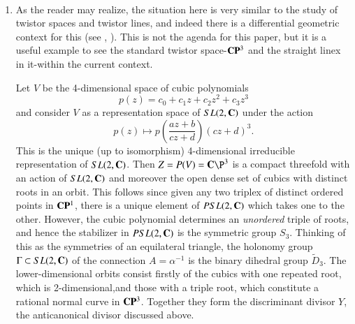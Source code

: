 \begin{example*}
~

\begin{enumerate}[]
\item As the reader may realize, the situation here is very similar to the study of twistor spaces and twistor lines, and indeed there is a differential geometric context for this (see \cite{art7-key6}, \cite{art7-key7}). This is not the agenda for this paper, but it is a useful example to see the standard twistor space-$\mathbf{C}\mathbf{P}^{3}$ and the straight linex in it-within the current context.

Let $V$ be the 4-dimensional space of cubic polynomials
$$
p(z)=c_{0} + c_{1}z +c_{2}z^{2} + c_{3}z^{3}
$$
and consider $V$ as a representation space of $SL(2, \mathbf{C})$ under the action
$$
p(z)\mapsto p \left( \dfrac{az + b}{cz + d}\right)(cz + d)^{3}.
$$
This is the unique (up to isomorphism) 4-dimensional irreducible representation of $SL(2, \mathbf{C})$. Then $Z= P(V) = \bC\P^{3}$ is a compact threefold with an action of $SL(2, \mathbf{C})$ and moreover the open dense set of cubics with distinct roots in an orbit. This follows since given any two triplex of distinct ordered points in $\mathbf{C}\mathbf{P}^{1}$, there is a unique element of $PSL(2, \mathbf{C})$ which takes one to the other. However, the cubic polynomial determines an \textit{unordered} triple of roots, and hence the stabilizer in $PSL(2, \mathbf{C})$ is the symmetric group $S_{3}$. Thinking of this as the symmetries of an equilateral triangle, the holonomy group $\Gamma \subset SL(2, \mathbf{C})$ of the connection $A= \alpha^{-1}$ is the binary dihedral group $\tilde{D}_{3}$. The lower-dimensional orbits consist firstly of the cubics with one repeated root, which is
2-dimensional,\pageoriginale and those with a triple root, which constitute a rational normal curve in $\mathbf{C}\mathbf{P}^{3}$. Together they form the discriminant divisor $Y$, the anticanonical divisor discussed above.


\end{enumerate}
\end{example*}
